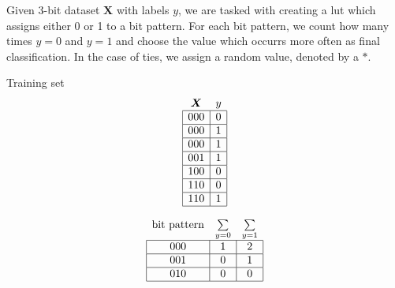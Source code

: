 \begin{example}\label{ex:1}
    Given 3-bit dataset $\bm{X}$ with labels $y$, we are tasked with creating a lut which assigns either 0 or 1 to a bit pattern. For each bit pattern, we count how many times $y=0$ and $y=1$ and choose the value which occurrs more often as final classification. In the case of ties, we assign a random value, denoted by a $*$.

\small
\begin{minipage}{.95\linewidth}\centering
  \begin{minipage}[b]{.2\linewidth}\centering
    Training set
    \begin{align*}
      \begin{array}{cc}
        \bm{X}                         & y                      \\ \hline
        \multicolumn{1}{|c|}{000} & \multicolumn{1}{c|}{0} \\ \hline
        \multicolumn{1}{|c|}{000} & \multicolumn{1}{c|}{1} \\ \hline
        \multicolumn{1}{|c|}{000} & \multicolumn{1}{c|}{1} \\ \hline
        \multicolumn{1}{|c|}{001} & \multicolumn{1}{c|}{1} \\ \hline
        \multicolumn{1}{|c|}{100} & \multicolumn{1}{c|}{0} \\ \hline
        \multicolumn{1}{|c|}{110} & \multicolumn{1}{c|}{0} \\ \hline
        \multicolumn{1}{|c|}{110} & \multicolumn{1}{c|}{1} \\ \hline
      \end{array}
    \end{align*}
  \end{minipage}
  \begin{minipage}[b]{.4\linewidth}\centering
    \begin{align*}
      \begin{array}{ccc}
        \text{bit pattern}        & \sum\limits_{y=0}      & \multicolumn{1}{l}{\sum\limits_{y=1}} \\ \hline
        \multicolumn{1}{|c|}{000} & \multicolumn{1}{c|}{1} & \multicolumn{1}{c|}{2}                \\ \hline
        \multicolumn{1}{|c|}{001} & \multicolumn{1}{c|}{0} & \multicolumn{1}{c|}{1}                \\ \hline
        \multicolumn{1}{|c|}{010} & \multicolumn{1}{c|}{0} & \multicolumn{1}{c|}{0}                \\ \hline

\end{array}
\end{align*}
\end{minipage}
\end{minipage}
\end{example}

